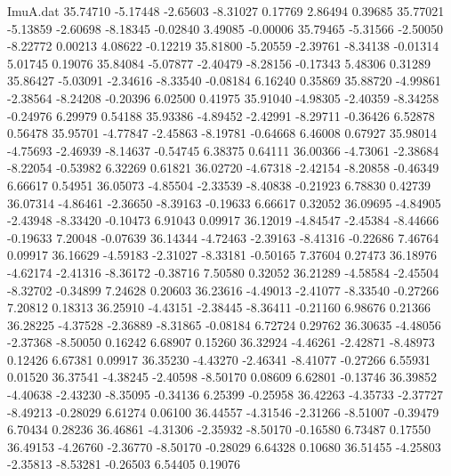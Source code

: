 \begin{filecontents}{ImuA.dat}
  35.74710   -5.17448   -2.65603   -8.31027    0.17769    2.86494    0.39685
  35.77021   -5.13859   -2.60698   -8.18345   -0.02840    3.49085   -0.00006
  35.79465   -5.31566   -2.50050   -8.22772    0.00213    4.08622   -0.12219
  35.81800   -5.20559   -2.39761   -8.34138   -0.01314    5.01745    0.19076
  35.84084   -5.07877   -2.40479   -8.28156   -0.17343    5.48306    0.31289
  35.86427   -5.03091   -2.34616   -8.33540   -0.08184    6.16240    0.35869
  35.88720   -4.99861   -2.38564   -8.24208   -0.20396    6.02500    0.41975
  35.91040   -4.98305   -2.40359   -8.34258   -0.24976    6.29979    0.54188
  35.93386   -4.89452   -2.42991   -8.29711   -0.36426    6.52878    0.56478
  35.95701   -4.77847   -2.45863   -8.19781   -0.64668    6.46008    0.67927
  35.98014   -4.75693   -2.46939   -8.14637   -0.54745    6.38375    0.64111
  36.00366   -4.73061   -2.38684   -8.22054   -0.53982    6.32269    0.61821
  36.02720   -4.67318   -2.42154   -8.20858   -0.46349    6.66617    0.54951
  36.05073   -4.85504   -2.33539   -8.40838   -0.21923    6.78830    0.42739
  36.07314   -4.86461   -2.36650   -8.39163   -0.19633    6.66617    0.32052
  36.09695   -4.84905   -2.43948   -8.33420   -0.10473    6.91043    0.09917
  36.12019   -4.84547   -2.45384   -8.44666   -0.19633    7.20048   -0.07639
  36.14344   -4.72463   -2.39163   -8.41316   -0.22686    7.46764    0.09917
  36.16629   -4.59183   -2.31027   -8.33181   -0.50165    7.37604    0.27473
  36.18976   -4.62174   -2.41316   -8.36172   -0.38716    7.50580    0.32052
  36.21289   -4.58584   -2.45504   -8.32702   -0.34899    7.24628    0.20603
  36.23616   -4.49013   -2.41077   -8.33540   -0.27266    7.20812    0.18313
  36.25910   -4.43151   -2.38445   -8.36411   -0.21160    6.98676    0.21366
  36.28225   -4.37528   -2.36889   -8.31865   -0.08184    6.72724    0.29762
  36.30635   -4.48056   -2.37368   -8.50050    0.16242    6.68907    0.15260
  36.32924   -4.46261   -2.42871   -8.48973    0.12426    6.67381    0.09917
  36.35230   -4.43270   -2.46341   -8.41077   -0.27266    6.55931    0.01520
  36.37541   -4.38245   -2.40598   -8.50170    0.08609    6.62801   -0.13746
  36.39852   -4.40638   -2.43230   -8.35095   -0.34136    6.25399   -0.25958
  36.42263   -4.35733   -2.37727   -8.49213   -0.28029    6.61274    0.06100
  36.44557   -4.31546   -2.31266   -8.51007   -0.39479    6.70434    0.28236
  36.46861   -4.31306   -2.35932   -8.50170   -0.16580    6.73487    0.17550
  36.49153   -4.26760   -2.36770   -8.50170   -0.28029    6.64328    0.10680
  36.51455   -4.25803   -2.35813   -8.53281   -0.26503    6.54405    0.19076

\end{filecontents}
